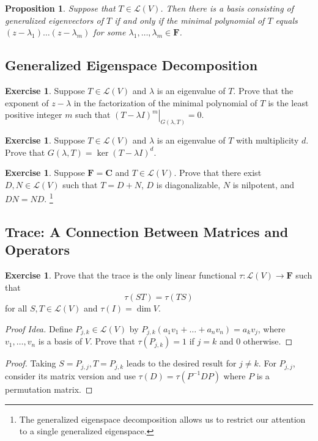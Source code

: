 \documentclass[nofonts,colorlinks]{tufte-handout}
\theoremstyle{plain} %
\newtheorem{prop}[thm]{Proposition}
\theoremstyle{definition}
\newtheorem{exer}[thm]{Exercise}
\theoremstyle{remark}
\newcommand{\rest}[2]{\mathopen{}\left.#1\right|_{#2}}
\newcommand{\C}{\mathbf{C}}
\newcommand{\F}{\mathbf{F}}
\renewcommand{\L}{\mathcal{L}}
\begin{document}
\begin{prop}
	Suppose that $T\in\L(V)$. Then there is a basis consisting of generalized eigenvectors of $T$ if and only if the minimal polynomial of $T$ equals $(z-\lambda_1)\dots(z-\lambda_m)$ for some $\lambda_1,\dots,\lambda_m\in\F$.
\end{prop}


\subsection{Generalized Eigenspace Decomposition}
\begin{exer}
	Suppose $T\in\L(V)$ and $\lambda$ is an eigenvalue of $T$. Prove that the exponent of $z-\lambda$ in the factorization of the minimal polynomial of $T$ is the least positive integer $m$ such that $\rest{(T-\lambda I)^m}{G(\lambda,T)}=0$.
\end{exer}

\begin{exer}
	Suppose $T\in\L(V)$ and $\lambda$ is an eigenvalue of $T$ with multiplicity $d$. Prove that $G(\lambda, T)=\ker(T-\lambda I)^d$.
\end{exer}

\begin{exer}
	Suppose $\F=\C$ and $T\in\L(V)$. Prove that there exist $D,N\in\L(V)$ such that $T=D+N$, $D$ is diagonalizable, $N$ is nilpotent, and $DN=ND$.%
	\footnote{The generalized eigenspace decomposition allows us to restrict our attention to a single generalized eigenspace.}
\end{exer}


\subsection{Trace: A Connection Between Matrices and Operators}
\begin{exer}
	Prove that the trace is the only linear functional $\tau:\L(V)\to\F$ such that
	\[\tau(ST)=\tau(TS)\]
	for all $S,T\in\L(V)$ and $\tau(I)=\dim V$.
\end{exer}
\begin{proof}[Proof Idea]
	Define $P_{j,k}\in\L(V)$ by $P_{j,k}(a_1v_1+\dots+a_nv_n)=a_kv_j$, where $v_1,\dots,v_n$ is a basis of $V$. Prove that $\tau(P_{j,k})=1$ if $j=k$ and $0$ otherwise.
\end{proof}
\begin{proof}
	Taking $S=P_{j,j},T=P_{j,k}$ leads to the desired result for $j\neq k$. For $P_{j,j}$, consider its matrix version and  use $\tau(D)=\tau(P^{-1}DP)$ where $P$ is a permutation matrix.
\end{proof}
\end{document}
